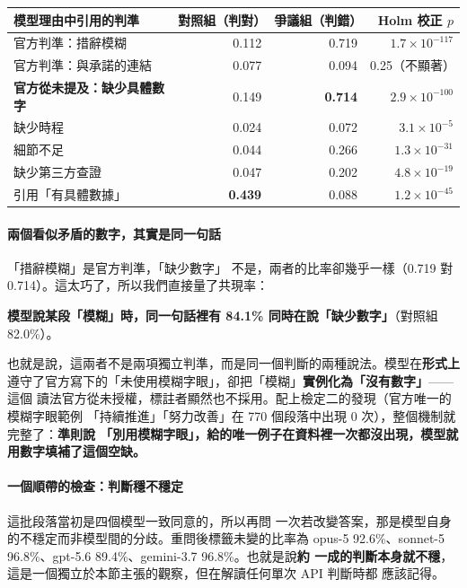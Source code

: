 \documentclass[11pt,a4paper]{ctexart}
\begin{document}
\begin{table}[h]
\centering\small
\begin{tabular}{@{}lrrr@{}}
\toprule
模型理由中引用的判準 & 對照組（判對） & 爭議組（判錯） & Holm 校正 $p$ \\
\midrule
官方判準：措辭模糊 & 0.112 & 0.719 & $1.7\times10^{-117}$ \\
\rowcolor{gray!12}
官方判準：與承諾的連結 & 0.077 & 0.094 & 0.25（不顯著）\\
\rowcolor{yellow!15}
\textbf{官方從未提及：缺少具體數字} & 0.149 & \textbf{0.714} & $2.9\times10^{-100}$ \\
缺少時程 & 0.024 & 0.072 & $3.1\times10^{-5}$ \\
細節不足 & 0.044 & 0.266 & $1.3\times10^{-31}$ \\
缺少第三方查證 & 0.047 & 0.202 & $4.8\times10^{-19}$ \\
\midrule
引用「有具體數據」 & \textbf{0.439} & 0.088 & $1.2\times10^{-45}$ \\
\bottomrule
\end{tabular}
\end{table}

\paragraph{兩個看似矛盾的數字，其實是同一句話} 「措辭模糊」是官方判準，「缺少數字」
不是，兩者的比率卻幾乎一樣（0.719 對 0.714）。這太巧了，所以我們直接量了共現率：

\begin{tcolorbox}[colback=yellow!12, colframe=yellow!60!black]
\textbf{模型說某段「模糊」時，同一句話裡有 84.1\% 同時在說「缺少數字」}（對照組 82.0\%）。
\end{tcolorbox}

也就是說，這兩者不是兩項獨立判準，而是同一個判斷的兩種說法。模型在\textbf{形式上}
遵守了官方寫下的「未使用模糊字眼」，卻把「模糊」\textbf{實例化為「沒有數字」}——這個
讀法官方從未授權，標註者顯然也不採用。配上檢定二的發現（官方唯一的模糊字眼範例
「持續推進」「努力改善」在 770 個段落中出現 0 次），整個機制就完整了：\textbf{準則說
「別用模糊字眼」，給的唯一例子在資料裡一次都沒出現，模型就用數字填補了這個空缺。}

\paragraph{一個順帶的檢查：判斷穩不穩定} 這批段落當初是四個模型一致同意的，所以再問
一次若改變答案，那是模型自身的不穩定而非模型間的分歧。重問後標籤未變的比率為
opus-5 92.6\%、sonnet-5 96.8\%、gpt-5.6 89.4\%、gemini-3.7 96.8\%。也就是說\textbf{約
一成的判斷本身就不穩}，這是一個獨立於本節主張的觀察，但在解讀任何單次 API 判斷時都
應該記得。
\end{document}
